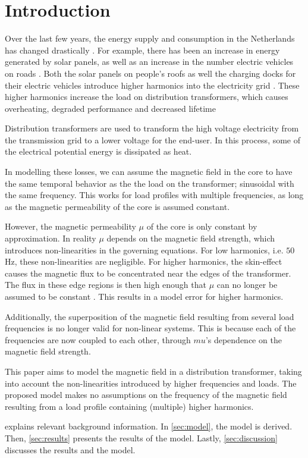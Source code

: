 \chapter{Introduction}

Over the last few years, the energy supply and consumption in the Netherlands has changed drastically \citehere. 
For example, there has been an increase in energy generated by solar panels, as well as an increase in the number electric vehicles on roads \citehere. 
Both the solar panels on people's roofs as well the charging docks for their electric vehicles introduce higher harmonics into the electricity grid \citehere.
These higher harmonics increase the load on distribution transformers, which causes overheating, degraded performance and decreased lifetime \cite{vanDijk2022}

Distribution transformers are used to transform the high voltage electricity from the transmission grid to a lower voltage for the end-user.
In this process, some of the electrical potential energy is dissipated as heat. 

In modelling these losses, we can assume the magnetic field in the core to have the same temporal behavior as the the load on the transformer; sinusoidal with the same frequency. \citehere 
This works for load profiles with multiple frequencies, as long as the magnetic permeability of the core is assumed constant.

However, the magnetic permeability $\mu$ of the core is only constant by approximation. In reality $\mu$ depends on the magnetic field strength, which introduces non-linearities in the governing equations.
For low harmonics, i.e. $50$ Hz, these non-linearities are negligible.
For higher harmonics, the skin-effect causes the magnetic flux to be concentrated near the edges of the transformer. 
The flux in these edge regions is then high enough that $\mu$ can no longer be assumed to be constant \citehere. 
This results in a model error for higher harmonics.

Additionally, the superposition of the magnetic field resulting from several load frequencies is no longer valid for non-linear systems.
This is because each of the frequencies are now coupled to each other, through $mu$'s dependence on the magnetic field strength.

This paper aims to model the magnetic field in a distribution transformer, taking into account the non-linearities introduced by higher frequencies and loads.
The proposed model makes no assumptions on the frequency of the magnetic field resulting from a load profile containing (multiple) higher harmonics.

 explains relevant background information. 
In \cref{sec:model}, the model is derived. 
Then, \cref{sec:results} presents the results of the model. 
Lastly, \cref{sec:discussion} discusses the results and the model.

